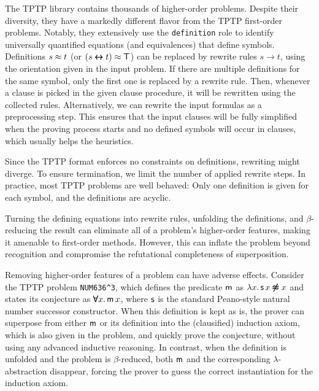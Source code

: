 \documentclass[smallcondensed,draft]{svjour3}     %
\begin{document}
The TPTP library contains thousands of higher-order problems. Despite their
diversity, they have a markedly different flavor from the TPTP first-order
problems. Notably, they extensively use the \verb|definition| role to identify
universally quantified equations (and equivalences) that define symbols.
%
Definitions $s \approx t$ (or $(s \pmb\leftrightarrow t) \approx \pmb\top$) can be replaced by rewrite
rules $s \rightarrow t$,
using the orientation given in the input problem. If there are multiple
definitions for the same symbol, only the first one is replaced by a rewrite rule.
Then, whenever a clause is picked in the given clause procedure, it will be rewritten
using the collected rules.
Alternatively, we can rewrite
the input formulas as a preprocessing step. This ensures that the input
clauses will be fully simplified when the proving process starts and no
defined symbols will occur in clauses, which usually helps the heuristics.

Since the TPTP format enforces no constraints on
definitions, rewriting might diverge. To ensure
termination, we limit the number of applied rewrite steps. In
practice, most TPTP problems are well behaved: Only one
definition is given for each symbol, and the definitions are acyclic.

Turning the defining equations into rewrite rules, unfolding the definitions, and
$\beta$-reduc\-ing the result can eliminate all of a problem's higher-order features, making
it amenable to first-order methods. However, this can inflate the problem
beyond recognition and compromise the refutational completeness of
superposition.

\begin{examplex} 
  Removing higher-order features of a problem can have adverse effects.
  Consider the TPTP problem \texttt{NUM636\^{}3}, which defines the predicate $\mathsf{m}$
  as $\lambda x.\, \mathsf{s} \, x \pmb{\not\approx} x$ and states its conjecture as $\pmb\forall
  x.\, \mathsf{m} \, x $, where $\mathsf{s}$ is the standard Peano-style natural number
  successor constructor. When this definition is kept as is, the
  prover can superpose from either $\mathsf{m}$ or its definition into the
  (clausified) induction axiom, which is also given in the problem, and quickly prove
  the conjecture, without using any advanced inductive reasoning. In contrast,
  when the definition is
  unfolded and the problem is $\beta$-reduced, both $\mathsf{m}$ and the
  corresponding $\lambda$-abstraction disappear, forcing the prover to guess the
  correct instantiation for the induction axiom.
\end{examplex}
\end{document}
